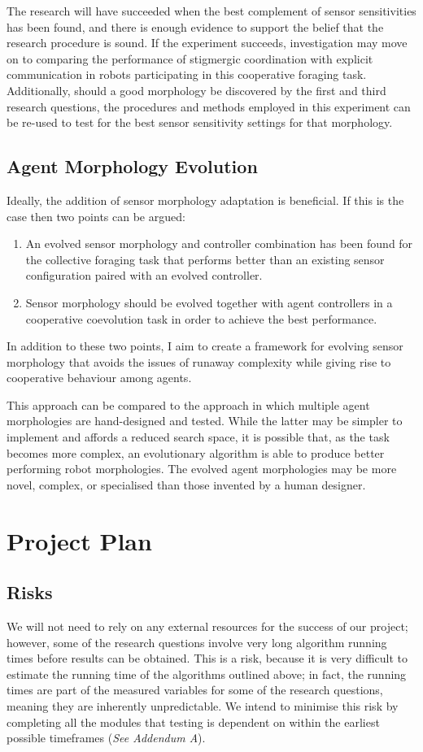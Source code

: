 \documentclass[a4paper,12pt]{article}
\begin{document}
The research will have succeeded when the best complement of sensor sensitivities has been found, and there is enough evidence to support the belief that the research procedure is sound. If the experiment succeeds, investigation may move on to comparing the performance of stigmergic coordination with explicit communication in robots participating in this cooperative foraging task. Additionally, should a good morphology be discovered by the first and third research questions, the procedures and methods employed in this experiment can be re-used to test for the best sensor sensitivity settings for that morphology.
 
\subsection{Agent Morphology Evolution}
Ideally, the addition of sensor morphology adaptation is beneficial. If this is the case then two points can be argued:
\begin{enumerate}
\item An evolved sensor morphology and controller combination has been found for the collective foraging task that performs better than an existing sensor configuration paired with an evolved controller.
\item Sensor morphology should be evolved together with agent controllers in a cooperative coevolution task in order to achieve the best performance.
\end{enumerate}

In addition to these two points, I aim to create a framework for evolving sensor morphology that avoids the issues of runaway complexity while giving rise to cooperative behaviour among agents.

This approach can be compared to the approach in which multiple agent morphologies are hand-designed and tested. While the latter may be simpler to implement and affords a reduced search space, it is possible that, as the task becomes more complex, an evolutionary algorithm is able to produce better performing robot morphologies. The evolved agent morphologies may be more novel, complex, or specialised than those invented by a human designer.

\section{Project Plan}

\subsection{Risks}
We will not need to rely on any external resources for the success of our project; however, some of the research questions involve very long algorithm running times before results can be obtained. This is a risk, because it is very difficult to estimate the running time of the algorithms outlined above; in fact, the running times are part of the measured variables for some of the research questions, meaning they are inherently unpredictable. We intend to minimise this risk by completing all the modules that testing is dependent on within the earliest possible timeframes (\textit{See Addendum A}).
\end{document}
